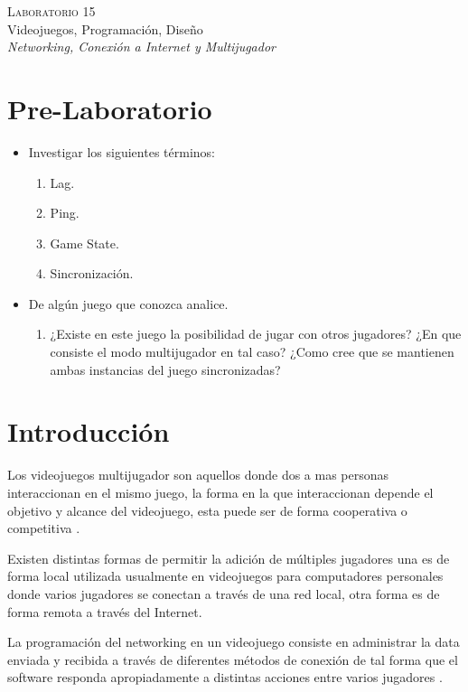 \begin{center}
\textsc{\Large Laboratorio 15}~\\
{\large Videojuegos, Programación, Diseño}~\\
\emph{Networking, Conexión a Internet y Multijugador}
\end{center}

\section{Pre-Laboratorio}
\begin{itemize}
\item Investigar los siguientes términos:
\begin{enumerate}
  \item Lag.
  \item Ping.
  \item Game State.
  \item Sincronización.
\end{enumerate}
\item De algún juego que conozca analice.
\begin{enumerate}
  \item ¿Existe en este juego la posibilidad de jugar con otros jugadores? ¿En que consiste el modo multijugador en tal caso? ¿Como cree que se mantienen ambas instancias del juego sincronizadas? 
\end{enumerate}
\end{itemize}

\section{Introducción}
Los videojuegos multijugador son aquellos donde dos a mas personas interaccionan en el mismo juego, la forma en la que interaccionan depende el objetivo y alcance del videojuego, esta puede ser de forma cooperativa o competitiva \cite{valve_networking}.

Existen distintas formas de permitir la adición de múltiples jugadores una es de forma local utilizada usualmente en videojuegos para computadores personales donde varios jugadores se conectan a través de una red local, otra forma es de forma remota a través del Internet.

La programación del networking en un videojuego consiste en administrar la data enviada y recibida a través de diferentes métodos de conexión de tal forma que el software responda apropiadamente a distintas acciones entre varios jugadores \cite[p.~355]{jenkinscreatinggames}.

